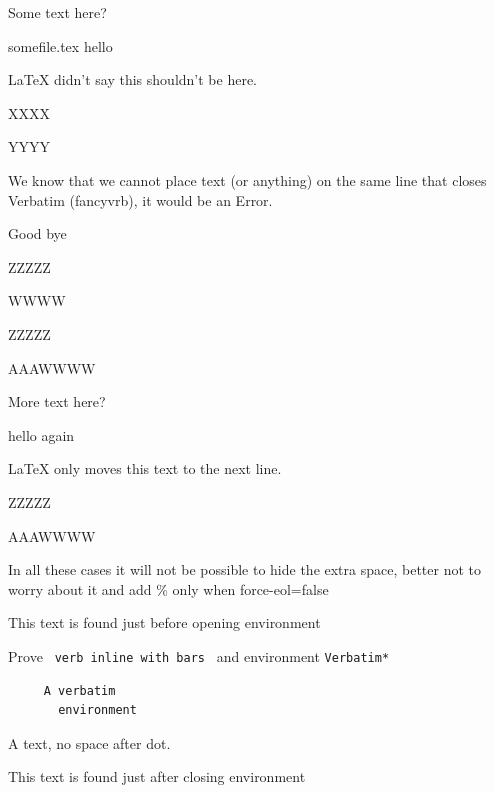 \documentclass{article}
\begin{document}
\begin{scontents}
Some text here?
\begin{filecontents}[overwrite]{somefile.tex}
hello
\end{filecontents}LaTeX didn't say this shouldn't be here.
\end{scontents}XXXX

YYYY


\begin{scontents}[print-env=false,force-eol]
We know that we cannot place text (or anything) on the same line that 
closes Verbatim (fancyvrb), it would be an Error.
\begin{Verbatim*}
Good bye
\end{Verbatim*}
\end{scontents}ZZZZZ

WWWW


ZZZZZ

AAAWWWW

\begin{scontents}[print-env=false,force-eol=false]
More text here?

\begin{verbatim*}
hello again
\end{verbatim*}LaTeX only moves this text to the next line.
\end{scontents}ZZZZZ

AAAWWWW

In all these cases it will not be possible to hide the extra space, 
better not to worry about it and add \% only when force-eol=false

This text is found just before opening environment 
\begin{scontents}[print-env=false]
Prove \verb*| verb inline with bars | and environment \verb+Verbatim*+
\begin{Verbatim}
     A verbatim  
       environment
\end{Verbatim}
A text, no space after dot.
\end{scontents}This text is found just after closing environment
\end{document}
